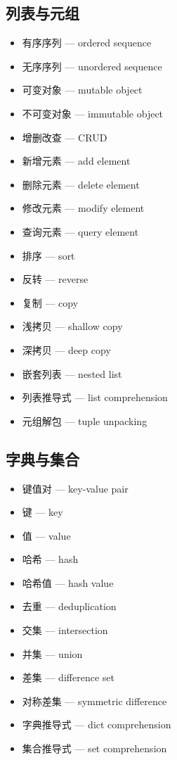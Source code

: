 \subsection{列表与元组}
\begin{itemize}
\item 有序序列 — ordered sequence
\item 无序序列 — unordered sequence
\item 可变对象 — mutable object
\item 不可变对象 — immutable object
\item 增删改查 — CRUD
\item 新增元素 — add element
\item 删除元素 — delete element
\item 修改元素 — modify element
\item 查询元素 — query element
\item 排序 — sort
\item 反转 — reverse
\item 复制 — copy
\item 浅拷贝 — shallow copy
\item 深拷贝 — deep copy
\item 嵌套列表 — nested list
\item 列表推导式 — list comprehension
\item 元组解包 — tuple unpacking
\end{itemize}

\subsection{字典与集合}
\begin{itemize}
\item 键值对 — key-value pair
\item 键 — key
\item 值 — value
\item 哈希 — hash
\item 哈希值 — hash value
\item 去重 — deduplication
\item 交集 — intersection
\item 并集 — union
\item 差集 — difference set
\item 对称差集 — symmetric difference
\item 字典推导式 — dict comprehension
\item 集合推导式 — set comprehension
\end{itemize}

